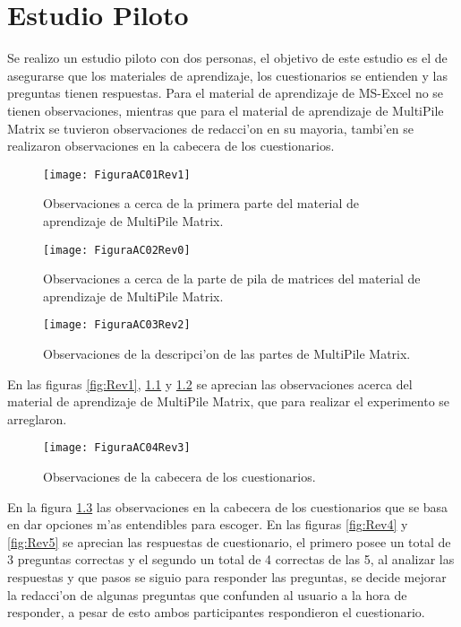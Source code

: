 \chapter{Estudio Piloto}
\label{MaterialMM}

Se realizo un estudio piloto con dos personas, el objetivo de este estudio es el de asegurarse que los materiales de aprendizaje, los cuestionarios se entienden y las preguntas tienen respuestas.
Para el material de aprendizaje de MS-Excel no se tienen observaciones, mientras que para el material de aprendizaje de MultiPile Matrix se tuvieron observaciones de redacci'on en su mayoria, tambi'en se realizaron observaciones en la cabecera de los cuestionarios. 

\begin{figure}[h]
    \centering
    \texttt{[image: FiguraAC01Rev1]}
    \caption{Observaciones a cerca de la primera parte del material de aprendizaje de MultiPile Matrix.}
    \label{fig:Rev1}
        \centering
    \texttt{[image: FiguraAC02Rev0]}
    \caption{Observaciones a cerca de la parte de pila de matrices del material de aprendizaje de MultiPile Matrix.}
    \label{fig:Rev0}
\end{figure}

\begin{figure}[h]
    \centering
    \texttt{[image: FiguraAC03Rev2]}
    \caption{Observaciones de la descripci'on de las partes de MultiPile Matrix.}
    \label{fig:Rev2}
\end{figure}

En las figuras \ref{fig:Rev1}, \ref{fig:Rev0} y \ref{fig:Rev2} se aprecian las observaciones acerca del material de aprendizaje de MultiPile Matrix, que para realizar el experimento se arreglaron.

\begin{figure}[h]
    \centering
    \texttt{[image: FiguraAC04Rev3]}
    \caption{Observaciones de la cabecera de los cuestionarios.}
    \label{fig:Rev3}
\end{figure}

En la figura \ref{fig:Rev3} las observaciones en la cabecera de los cuestionarios que se basa en dar opciones m'as entendibles para escoger. En las figuras \ref{fig:Rev4} y \ref{fig:Rev5} se aprecian las respuestas de cuestionario, el primero posee un total de 3 preguntas correctas y el segundo un total de 4 correctas de las 5, al analizar las respuestas y que pasos se siguio para responder las preguntas, se decide mejorar la redacci'on de algunas preguntas que confunden al usuario a la hora de responder, a pesar de esto ambos participantes respondieron el cuestionario.

